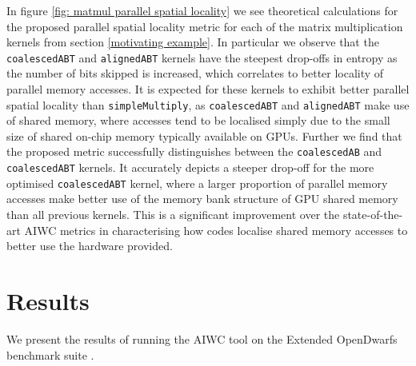 \documentclass[review=false, sigchi]{acmart}
\begin{document}
	In figure \ref{fig: matmul parallel spatial locality} we see theoretical calculations for the proposed parallel spatial locality metric for each of the matrix multiplication kernels from section \ref{motivating example}. In particular we observe that the \texttt{coalescedABT} and \texttt{alignedABT} kernels have the steepest drop-offs in entropy as the number of bits skipped is increased, which correlates to better locality of parallel memory accesses. It is expected for these kernels to exhibit better parallel spatial locality than \texttt{simpleMultiply}, as \texttt{coalescedABT} and \texttt{alignedABT} make use of shared memory, where accesses tend to be localised simply due to the small size of shared on-chip memory typically available on GPUs. Further we find that the proposed metric successfully distinguishes between the \texttt{coalescedAB} and \texttt{coalescedABT} kernels. It accurately depicts a steeper drop-off for the more optimised \texttt{coalescedABT} kernel, where a larger proportion of parallel memory accesses make better use of the memory bank structure of GPU shared memory than all previous kernels. This is a significant improvement over the state-of-the-art AIWC metrics in characterising how codes localise shared memory accesses to better use the hardware provided.
	
	\section{Results}
	
	We present the results of running the AIWC tool on the Extended OpenDwarfs benchmark suite \cite{opendwarfs2017base,extendedopendwarfs}.
	
\end{document}
